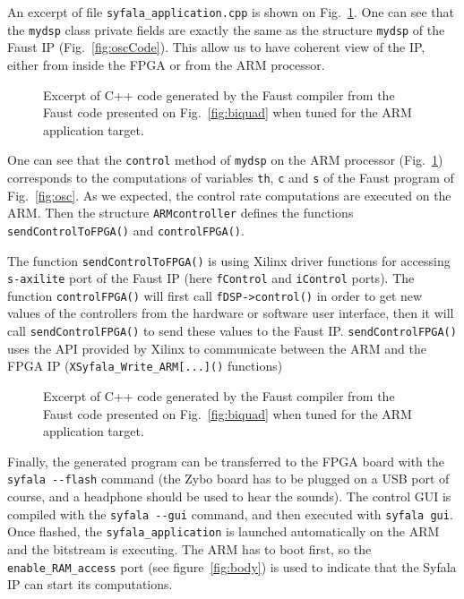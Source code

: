 An excerpt of file {\tt syfala\_application.cpp} is shown on Fig.~\ref{fig:oscARM}. One can see that the {\tt mydsp} class private fields are exactly the same as the structure {\tt mydsp} of the Faust IP (Fig.~\ref{fig:oscCode}). This allow us to have coherent view of the IP, either from inside the FPGA or from the ARM processor. 

\begin{figure}[ht]
  \begin{boxedminipage}{\columnwidth}
    \tiny
    
  \end{boxedminipage}
  \caption{Excerpt of C++ code generated by the Faust compiler from the Faust code presented on Fig.~\ref{fig:biquad} when tuned for the ARM application target.}
  \label{fig:oscARM}
\end{figure}


One can see that the {\tt control} method of {\tt mydsp} on the ARM processor (Fig.~\ref{fig:oscARM}) corresponds to the computations of variables {\tt th}, {\tt c} and {\tt s} of the Faust program of Fig.~\ref{fig:osc}. As we expected, the control rate computations are executed on the ARM. Then the structure {\tt ARMcontroller} defines the functions {\tt sendControlToFPGA()} and {\tt controlFPGA()}.

The function {\tt sendControlToFPGA()} is using Xilinx driver functions for accessing {\tt s-axilite} port of the Faust IP (here {\tt fControl} and {\tt iControl} ports). The function {\tt controlFPGA()}  will first call {\tt \verb#fDSP->control()#} in order to get new values of the controllers from the hardware or software user interface, then it will call  {\tt sendControlFPGA()} to send these values to the Faust IP. {\tt sendControlFPGA()} uses the API provided by Xilinx to communicate between the ARM and the FPGA IP (\verb#XSyfala_Write_ARM[...]()# functions)

\begin{figure}[ht]
  \begin{boxedminipage}{\columnwidth}
    \tiny
    
  \end{boxedminipage}
  \caption{Excerpt of C++ code generated by the Faust compiler from the Faust code presented on Fig.~\ref{fig:biquad} when tuned for the ARM application target.}
  \label{fig:oscARM2}
\end{figure}

Finally, the generated program can be transferred to the FPGA board with the  \verb#syfala --flash# command (the Zybo board has to be plugged on a USB port of course, and a headphone should be used to hear the sounds). The control GUI is compiled with the \verb#syfala --gui# command, and then executed with \verb#syfala gui#. Once flashed, the {\tt syfala\_application} is launched automatically on the ARM and the bitstream is executing. The ARM has to boot first, so the {\tt enable\_RAM\_access} port (see figure~\ref{fig:body}) is used to indicate that the Syfala IP can start its computations.





